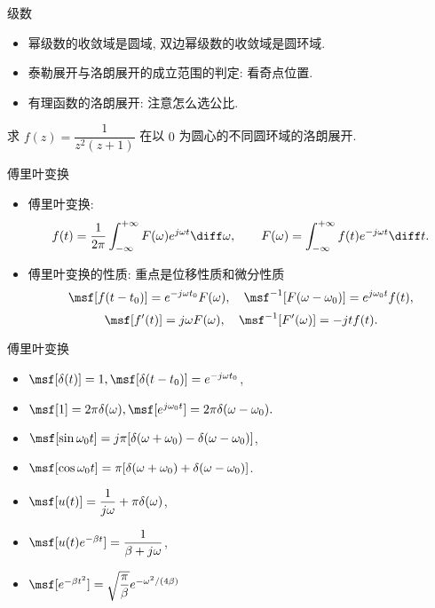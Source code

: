 \documentclass[aspectratio=169,handout]{ctexbeamer}
\begin{document}
\begin{frame}{级数}
	\begin{itemize}
		\item 幂级数的收敛域是圆域, 双边幂级数的收敛域是圆环域.
		\item 泰勒展开与洛朗展开的成立范围的判定: 看奇点位置.
		\item 有理函数的洛朗展开: 注意怎么选公比.
	\end{itemize}
	\onslide<+->
	\begin{exercise}
		求 $f(z)=\dfrac{1}{z^2(z+1)}$ 在以 $0$ 为圆心的不同圆环域的洛朗展开.
	\end{exercise}
\end{frame}


\begin{frame}{傅里叶变换}
	\begin{itemize}
		\item 傅里叶变换:
		\[
			f(t)=\frac1{2\pi} \int_{-\infty}^{+\infty}F(\omega) e^{j\omega t} \diff\omega,\qquad
			F(\omega)=\int_{-\infty}^{+\infty}f(t) e^{-j\omega t} \diff t.
		\]
		\item 傅里叶变换的性质: 重点是位移性质和微分性质
		\[
			\msf[f(t-t_0)]=e^{-j\omega t_0}F(\omega),\quad
			\msf^{-1}[F(\omega-\omega_0)]=e^{j\omega_0 t}f(t),
		\]
		\[
			\msf[f'(t)]=j\omega F(\omega),\quad
			\msf^{-1}[F'(\omega)]=-jtf(t).
		\]
	\end{itemize}
\end{frame}


\begin{frame}{傅里叶变换}
	\begin{itemize}
		\item $\msf[\delta(t)]=1,\msf[\delta(t-t_0)]=e^{-j\omega t_0}$,
		\item $\msf[1]=2\pi \delta(\omega),\msf[e^{j\omega_0 t}]=2\pi\delta(\omega-\omega_0).$
		\item $\msf[\sin{\omega_0 t}]=j\pi[\delta(\omega+\omega_0)-\delta(\omega-\omega_0)]$,
		\item $\msf[\cos{\omega_0 t}]=\pi[\delta(\omega+\omega_0)+\delta(\omega-\omega_0)]$.
		\item $\msf[u(t)]=\dfrac1{j\omega}+\pi\delta(\omega)$,
		\item $\msf[u(t)e^{-\beta t}]=\dfrac1{\beta+j\omega}$,
		\item $\msf[e^{-\beta t^2}]=\sqrt{\dfrac\pi\beta}e^{-\omega^2/(4\beta)}$
	\end{itemize}
\end{frame}
\end{document}
